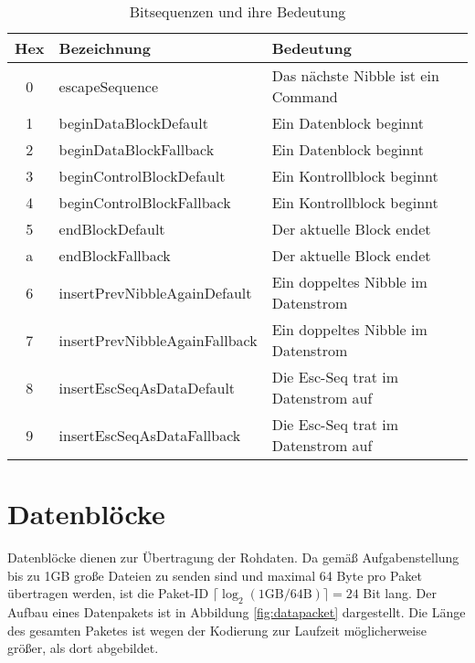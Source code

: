 \begin{table}[H]
    \center
    \def\arraystretch{1.3}
    \begin{tabular}{|c|l|l|l|}
        \rowcolor{gray!50}
        \hline
        \textbf{Hex} & \textbf{Bezeichnung}          & \textbf{Bedeutung}                 \\
        \hline
        0            & escapeSequence                & Das nächste Nibble ist ein Command \\
        1            & beginDataBlockDefault         & Ein Datenblock beginnt             \\
        2            & beginDataBlockFallback        & Ein Datenblock beginnt             \\
        3            & beginControlBlockDefault      & Ein Kontrollblock beginnt          \\
        4            & beginControlBlockFallback     & Ein Kontrollblock beginnt          \\
        5            & endBlockDefault               & Der aktuelle Block endet           \\
        a            & endBlockFallback              & Der aktuelle Block endet           \\
        6            & insertPrevNibbleAgainDefault  & Ein doppeltes Nibble im Datenstrom \\
        7            & insertPrevNibbleAgainFallback & Ein doppeltes Nibble im Datenstrom \\
        8            & insertEscSeqAsDataDefault     & Die Esc-Seq trat im Datenstrom auf \\
        9            & insertEscSeqAsDataFallback    & Die Esc-Seq trat im Datenstrom auf \\
        \hline
    \end{tabular}
    \caption{Bitsequenzen und ihre Bedeutung}
    \label{tab:escape_sequences}
\end{table}

\section{Datenblöcke}
Datenblöcke dienen zur Übertragung der Rohdaten. Da gemäß Aufgabenstellung bis zu 1GB große Dateien zu senden sind und maximal 64 Byte pro Paket übertragen werden, ist die Paket-ID $\lceil \log_{2}{(1\text{GB} / 64 \text{B})} \rceil = 24$ Bit lang. Der Aufbau eines Datenpakets ist in Abbildung \ref{fig:datapacket} dargestellt. Die Länge des gesamten Paketes ist wegen der Kodierung zur Laufzeit möglicherweise größer, als dort abgebildet.
\vspace{0.5cm}

